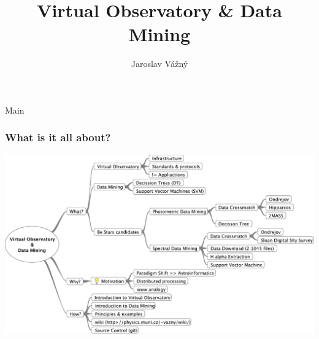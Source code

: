 \documentclass[fleqn]{beamer}
\title[VO \& Data Mining] %
{Virtual Observatory \& Data Mining}
\author[Jaroslav Vážný] %
{Jaroslav Vážný }
\institute[Universities of Somewhere and Elsewhere] %
{

    Masarykova univerzita

}
\begin{document}
 




\begin{frame}
  \titlepage
\end{frame}



\begin{section}{Main}
\begin{frame}\frametitle{What is it all about?}
  \begin{center}
    \includegraphics[width=1.0\textwidth]{mainAll}    
  \end{center}
\end{frame}
\end{section}
\end{document}
